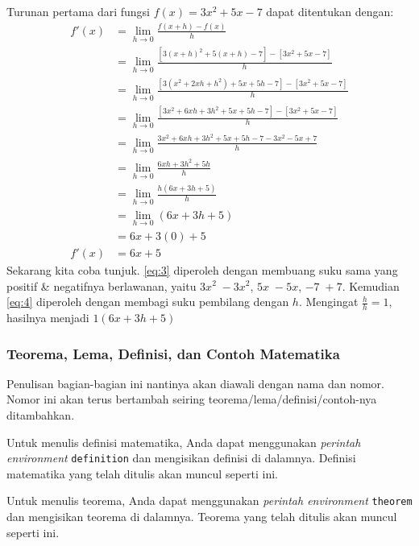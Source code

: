 \begin{enumerate}[label=\arabic*)]
    Turunan pertama dari fungsi $f(x) = 3x^2 + 5x − 7$ dapat ditentukan dengan:
    \begin{align}
        f'(x) &= \lim_{h \to 0} \frac{f(x+h) - f(x)}{h} \nonumber \\
        &= \lim_{h \to 0} \frac{[3(x+h)^2 + 5(x+h) - 7] - [3x^2 + 5x - 7]}{h} \nonumber \\
        &= \lim_{h \to 0} \frac{[3(x^2 + 2xh + h^2) + 5x + 5h - 7] - [3x^2 + 5x - 7]}{h} \nonumber \\
        &= \lim_{h \to 0} \frac{[3x^2 + 6xh + 3h^2 + 5x + 5h - 7] - [3x^2 + 5x - 7]}{h} \nonumber \\
        &= \lim_{h \to 0} \frac{3x^2 + 6xh + 3h^2 + 5x + 5h - 7 - 3x^2 - 5x + 7}{h} \nonumber \\
        &= \lim_{h \to 0} \frac{6xh + 3h^2 + 5h}{h} \label{eq:3} \\
        &= \lim_{h \to 0} \frac{h(6x + 3h + 5)}{h} \nonumber \\
        &= \lim_{h \to 0} (6x + 3h + 5) \label{eq:4} \\
        &= 6x + 3(0) + 5 \nonumber \\
        f'(x) &= 6x + 5 \nonumber
    \end{align}
    Sekarang kita coba tunjuk. \autoref{eq:3} diperoleh dengan membuang suku sama yang positif \& negatifnya berlawanan, yaitu $3x^2\; -3x^2$, $5x\; -5x$, $-7\; +7$. Kemudian \autoref{eq:4} diperoleh dengan membagi suku pembilang dengan $h$. Mengingat $\frac{h}{h} = 1$, hasilnya menjadi $1(6x + 3h + 5)$
\end{enumerate}

\subsubsection{Teorema, Lema, Definisi, dan Contoh Matematika}

Penulisan bagian-bagian ini nantinya akan diawali dengan nama dan nomor. Nomor ini akan terus bertambah seiring teorema/lema/definisi/contoh-nya ditambahkan.

\begin{definition}
    Untuk menulis definisi matematika, Anda dapat menggunakan \textit{perintah environment} \texttt{definition} dan mengisikan definisi di dalamnya. Definisi matematika yang telah ditulis akan muncul seperti ini.
\end{definition}

\begin{theorem}
    Untuk menulis teorema, Anda dapat menggunakan \textit{perintah environment} \texttt{theorem} dan mengisikan teorema di dalamnya. Teorema yang telah ditulis akan muncul seperti ini.
\end{theorem}


